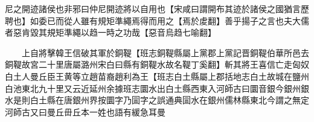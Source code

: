 尼之開迹諸侯也非邪曰仲尼開迹將以自用也【宋咸曰謂開布其迹於諸侯之國猶言歷聘也】如委已而從人雖有規矩準繩焉得而用之【焉於䖍翻】善乎揚子之言也夫大儒者惡肯毀其規矩準繩以趋一時之功哉【惡音烏趋七喻翻】

　　上自將擊韓王信破其軍於銅鞮【班志銅鞮縣屬上黨郡上黨記晋銅鞮伯華所邑去銅鞮故宮二十里唐屬潞州宋白曰縣有銅鞮水故名鞮丁奚翻】斬其將王喜信亡走匈奴白土人曼丘臣王黄等立趙苗裔趙利為王【班志白土縣屬上郡括地志白土故城在鹽州白池東北九十里又云近延州余據班志圜水出白土縣西東入河師古曰圜音銀今銀州銀水是則白土縣在唐銀州界按圜字乃圁字之誤通典圁水在銀州儒林縣東北今謂之無定河師古又曰曼丘毌丘本一姓也語有緩急耳曼